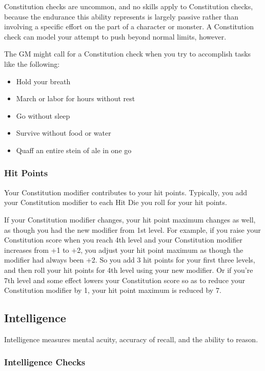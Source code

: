 Constitution checks are uncommon, and no skills apply to Constitution checks, because the endurance this ability represents is largely passive rather than involving a specific effort on the part of a character or monster. A Constitution check can model your attempt to push beyond normal limits, however.

The GM might call for a Constitution check when you try to accomplish tasks like the following:

\begin{itemize}
\item Hold your breath
\item March or labor for hours without rest
\item Go without sleep
\item Survive without food or water
\item Quaff an entire stein of ale in one go
\end{itemize}

\subsubsection{Hit Points}

Your Constitution modifier contributes to your hit points. Typically, you add your Constitution modifier to each Hit Die you roll for your hit points.

If your Constitution modifier changes, your hit point maximum changes as well, as though you had the new modifier from 1st level. For example, if you raise your Constitution score when you reach 4th level and your Constitution modifier increases from +1 to +2, you adjust your hit point maximum as though the modifier had always been +2. So you add 3 hit points for your first three levels, and then roll your hit points for 4th level using your new modifier. Or if you're 7th level and some effect lowers your Constitution score so as to reduce your Constitution modifier by 1, your hit point maximum is reduced by 7.

\subsection{Intelligence}

Intelligence measures mental acuity, accuracy of recall, and the ability to reason.

\subsubsection{Intelligence Checks}

